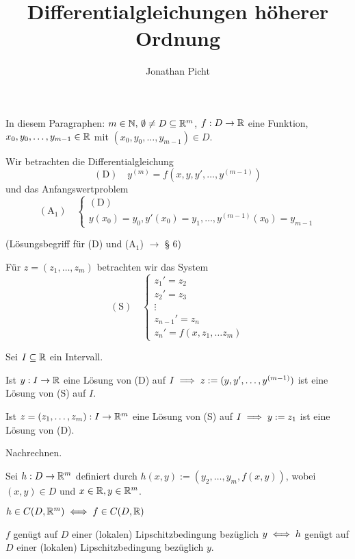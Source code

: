\documentclass{article}
\title{Differentialgleichungen höherer Ordnung}
\author{Jonathan Picht}
\begin{document}
\maketitle

In diesem Paragraphen: $m \in \mathbb{N}, \, \emptyset \neq D \subseteq \mathbb{R}^{m}$, $f:D\rightarrow \mathbb{R}$
eine Funktion, $x_0, y_0, \ldots, y_{m-1} \in \mathbb{R}$ mit $(x_0, y_0, \ldots, y_{m-1}) \in D$.

Wir betrachten die Differentialgleichung
$$(\text{D})\quad y^{(m)} = f(x, y, y', \ldots, y^{(m-1)})$$
und das Anfangswertproblem
$$(\text{A}_1)\quad
\begin{cases}
(\text{D}) \\
y(x_0) = y_0, y'(x_0) = y_1, \ldots, y^{(m-1)}(x_0) = y_{m-1}
\end{cases}$$

(Lösungsbegriff für (D) und (A$_1$) $\rightarrow$ § 6)

Für $z = (z_1, \ldots, z_m)$ betrachten wir das System
$$(\text{S}) \quad
\begin{cases}
z_1'=z_2\\
z_2'=z_3\\
\vdots\\
z_{n-1}'=z_n\\
z_n'=f(x, z_1, \ldots z_m)
\end{cases}$$

\begin{satz} %
Sei $I \subseteq \mathbb{R}$ ein Intervall.
\begin{liste}
\item Ist $y:I\rightarrow \mathbb{R}$ eine Lösung von (D) auf $I \implies z := (y, y', \ldots, y^{(m-1)})$ ist eine Lösung von (S) auf $I$.
\item Ist $z = (z_1, \ldots , z_m):I \rightarrow \mathbb{R}^m$ eine Lösung von (S) auf $I \implies y:=z_1$ ist eine Lösung von (D).
\end{liste}
\end{satz}

\begin{beweis}
Nachrechnen.
\end{beweis}

\begin{satz} %
Sei $h:D \rightarrow \mathbb{R}^m$ definiert durch $h(x,y):=(y_2, \ldots, y_m, f(x,y))$, wobei $(x,y) \in D$ und $x \in \mathbb{R}, y \in \mathbb{R}^m$.
\begin{liste}
\item $h \in C(D, \mathbb{R}^m) \iff f \in C(D,\mathbb{R})$
\item $f$ genügt auf $D$ einer (lokalen) Lipschitzbedingung bezüglich $y \iff h$ genügt auf $D$ einer (lokalen) Lipschitzbedingung bezüglich $y$.
\end{liste}
\end{satz}
\end{document}
